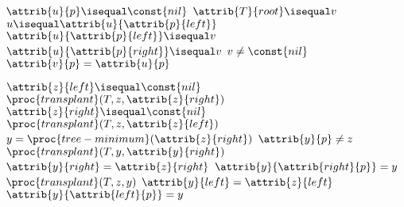 \documentclass{article}
\begin{document}
\begin{codebox}
\li \If $\attrib{u}{p} \isequal \const{nil}$
\li \Then
        $\attrib{T}{root} \isequal v$
\li \ElseIf $u \isequal \attrib{u}{\attrib{p}{left}}$
\li \Then
        $\attrib{u}{\attrib{p}{left}} \isequal v$
\li \Else
\li     $\attrib{u}{\attrib{p}{right}} \isequal v$
    \End
\li \If $v \neq \const{nil}$
\li \Then
        $\attrib{v}{p} = \attrib{u}{p}$
    \End
\end{codebox}

\begin{codebox}
\li \If $\attrib{z}{left} \isequal \const{nil}$
\li \Then
        $\proc{transplant}(T, z, \attrib{z}{right})$
\li \ElseIf $\attrib{z}{right} \isequal \const{nil}$
\li \Then
        $\proc{transplant}(T, z, \attrib{z}{left})$
\li \Else
\li     $y = \proc{tree-minimum}(\attrib{z}{right})$
\li     \If $\attrib{y}{p} \neq z$
\li     \Then
            $\proc{transplant}(T, y, \attrib{y}{right})$
\li         $\attrib{y}{right} = \attrib{z}{right}$
\li         $\attrib{y}{\attrib{right}{p}} = y$
        \End
\li     $\proc{transplant}(T, z, y)$
\li     $\attrib{y}{left} = \attrib{z}{left}$
\li     $\attrib{y}{\attrib{left}{p}} = y$
    \End
\end{codebox}
\end{document}
